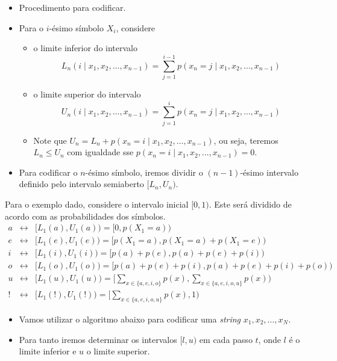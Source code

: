 \begin{frame}[allowframebreaks]
  \framebreak

  \begin{itemize}
  \item Procedimento para codificar.
  \item Para o $i$-ésimo símbolo $X_i$, considere
	\begin{itemize}
	\item o limite inferior do intervalo
		\begin{equation}
		L_n(i \mid x_1, x_2, \ldots, x_{n-1}) = \sum_{j=1}^{i-1} p(x_n = j \mid x_1, x_2, \ldots, x_{n-1})
		\end{equation} 
	\item o limite superior do intervalo
		\begin{equation}
		U_n(i \mid x_1, x_2, \ldots, x_{n-1}) = \sum_{j=1}^{i} p(x_n = j \mid x_1, x_2, \ldots, x_{n-1})
		\end{equation}
	\item Note que $U_n = L_n + p(x_n = i \mid x_1, x_2, \ldots, x_{n-1})$, ou seja, teremos $L_n \leq U_n$ com
		igualdade sse $p(x_n = i \mid x_1, x_2, \ldots, x_{n-1}) = 0$.
	\end{itemize}
  \item Para codificar o $n$-ésimo símbolo, iremos dividir o $(n-1)$-ésimo intervalo definido 
	pelo intervalo semiaberto $[L_n, U_n)$.
  \end{itemize}

  \framebreak

  Para o exemplo dado, considere o intervalo inicial $[0,1)$. Este será dividido de acordo com
  as probabilidades dos símbolos.
  \begin{eqnarray}
  a &\leftrightarrow& [L_1(a), U_1(a)) = [0, p(X_1=a)) \\
  e &\leftrightarrow& [L_1(e), U_1(e)) = [p(X_1=a), p(X_1=a)+p(X_1=e)) \\
  i &\leftrightarrow& [L_1(i), U_1(i)) = [p(a)+p(e), p(a)+p(e)+p(i)) \\
  o &\leftrightarrow& [L_1(o), U_1(o)) = [p(a)+p(e)+p(i), p(a)+p(e)+p(i)+p(o)) \\
  u &\leftrightarrow& [L_1(u), U_1(u)) = [\sum_{x\in \{a,e,i,o\}} p(x), \sum_{x\in \{a,e,i,o,u\}} p(x) ) \\
  ! &\leftrightarrow& [L_1(!), U_1(!)) = [\sum_{x\in \{a,e,i,o,u\}} p(x), 1)
  \end{eqnarray}

  \framebreak

  \begin{itemize}
  \item Vamos utilizar o algoritmo abaixo para codificar uma \textit{string} $x_1, x_2, \ldots, x_N$.
  \item Para tanto iremos determinar os intervalos $[l,u)$ em cada passo $t$, onde $l$ é o limite
	inferior e $u$ o limite superior.
  \end{itemize}


\end{frame}
